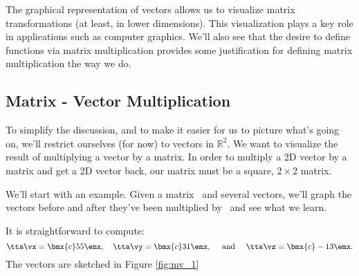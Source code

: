 The graphical representation of vectors allows us to visualize matrix transformations (at least, in lower dimensions). This visualization plays a key role in applications such as computer graphics. We'll also see that the desire to define functions via matrix multiplication provides some justification for defining matrix multiplication the way we do.

\subsection*{Matrix - Vector Multiplication}
To simplify the discussion, and to make it easier for us to picture what's going on, we'll restrict ourselves (for now) to vectors in $\mathbb{R}^2$. We want to visualize the result of multiplying a vector by a matrix. In order to multiply a 2D vector by a matrix and get a 2D vector back, our matrix must be a square, $2\times 2$ matrix.


We'll start with an example. Given a matrix \tta\ and several vectors, we'll graph the vectors before and after they've been multiplied by \tta\ and see what we learn.

\medskip

{\begin{myfigure}%
\begin{center}
\end{center}
\label{fig:mv_1}
\end{myfigure}%

It is straightforward to compute: 
\[
\tta\vx = \bmx{c} 5\\5\emx,\quad \tta\vy = \bmx{c} 3\\1\emx, \quad \text{ and } \quad \tta\vz = \bmx{c} -1\\3\emx.
\]
The vectors are sketched in Figure \ref{fig:mv_1}
}

